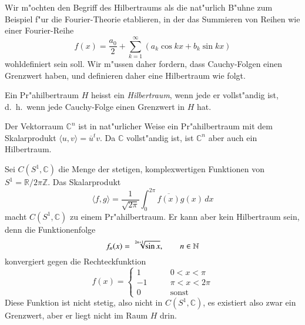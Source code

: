 Wir m"ochten den Begriff des Hilbertraums als die nat"urlich B"uhne zum
Beispiel f"ur die Fourier-Theorie etablieren, in der das Summieren von
Reihen wie einer Fourier-Reihe
\[
f(x) = \frac{a_0}2+\sum_{k=1}^\infty (a_k\cos kx+b_k\sin kx)
\]
wohldefiniert sein soll.
Wir m"ussen daher fordern, dass Cauchy-Folgen einen Grenzwert haben,
und definieren daher eine Hilbertraum wie folgt.

\begin{definition}
Ein Pr"ahilbertraum $H$ heisst ein {\em Hilbertraum}, wenn jede er 
vollst"andig ist, d.~h.~wenn jede Cauchy-Folge einen Grenzwert in $H$ hat.
\end{definition}

\begin{beispiel}
Der Vektorraum $\mathbb C^n$ ist in nat"urlicher Weise ein Pr"ahilbertraum
mit dem Skalarprodukt $\langle u,v\rangle = \overline{u}^t v$.
Da $\mathbb C$ vollst"andig ist, ist $\mathbb C^n$ aber auch ein
Hilbertraum.
\end{beispiel}

\begin{beispiel}
Sei $C(S^1, \mathbb C)$ die Menge der stetigen, komplexwertigen Funktionen 
von $S^1 = \mathbb R/2\pi\mathbb Z$.
Das Skalarprodukt
\[
\langle f,g\rangle = \frac1{\sqrt{2\pi}}\int_0^{2\pi} \overline{f(x)} g(x)\,dx
\]
macht $C(S^1,\mathbb C)$ zu einem Pr"ahilbertraum.
Er kann aber kein Hilbertraum sein, denn die Funktionenfolge
\[
f_n(x)=\root{2n+1}\of{\sin x},\qquad n\in\mathbb N
\]
konvergiert gegen die Rechteckfunktion
\[
f(x)=\begin{cases}
1&\qquad 0<x<\pi\\
-1&\qquad \pi<x<2\pi\\
0&\qquad\text{sonst}
\end{cases}
\]
Diese Funktion ist nicht stetig, also nicht in $C(S^1,\mathbb C)$, es existiert
also zwar ein Grenzwert, aber er liegt nicht im Raum $H$ drin.
\end{beispiel}

